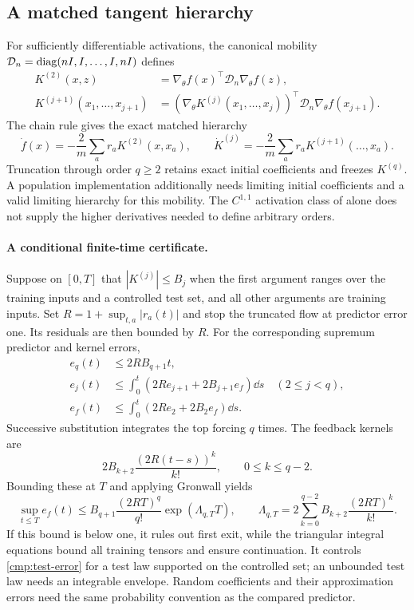 \subsection{A matched tangent hierarchy}
\label{app:comparison-nth}

For sufficiently differentiable activations, the canonical mobility
$\mathcal D_n=\operatorname{diag}(nI,I,\ldots,I,nI)$ defines
\begin{align*}
 K^{(2)}(x,z)&=\nabla_\theta f(x)^\top\mathcal D_n\nabla_\theta f(z),\\
 K^{(j+1)}(x_1,\ldots,x_{j+1})&=
 (\nabla_\theta K^{(j)}(x_1,\ldots,x_j))^\top
 \mathcal D_n\nabla_\theta f(x_{j+1}).
\end{align*}
The chain rule gives the exact matched hierarchy
\begin{equation}
 \dot f(x)=-\frac{2}{m}\sum_a r_aK^{(2)}(x,x_a),\qquad
 \dot K^{(j)}=-\frac{2}{m}\sum_a r_aK^{(j+1)}(\ldots,x_a).
 \label{cmp:nth-flow}
\end{equation}
Truncation through order $q\ge2$ retains exact initial coefficients and
freezes $K^{(q)}$.  A population implementation additionally needs limiting
initial coefficients and a valid limiting hierarchy for this mobility.
The $C^{1,1}$ activation class of  alone does not supply
the higher derivatives needed to define arbitrary orders.

\paragraph{A conditional finite-time certificate.}
Suppose on $[0,T]$ that $|K^{(j)}|\le B_j$ when the first argument ranges
over the training inputs and a controlled test set, and all other arguments
are training inputs.  Set $R=1+\sup_{t,a}|r_a(t)|$ and stop the truncated
flow at predictor error one.  Its residuals are then bounded by $R$.
For the corresponding supremum predictor and kernel errors,
\begin{align}
 e_q(t)&\le2RB_{q+1}t,\nonumber\\
 e_j(t)&\le\int_0^t(2Re_{j+1}+2B_{j+1}e_f)\dd s
                  \quad(2\le j<q),\nonumber\\
 e_f(t)&\le\int_0^t(2Re_2+2B_2e_f)\dd s.
 \label{cmp:nth-recursion}
\end{align}
Successive substitution integrates the top forcing $q$ times.  The feedback
kernels are
\[
 2B_{k+2}\frac{(2R(t-s))^k}{k!},\qquad 0\le k\le q-2.
\]
Bounding these at $T$ and applying Gronwall yields
\begin{equation}
 \sup_{t\le T}e_f(t)\le
 B_{q+1}\frac{(2RT)^q}{q!}\exp(\Lambda_{q,T}T),\qquad
 \Lambda_{q,T}=2\sum_{k=0}^{q-2}B_{k+2}\frac{(2RT)^k}{k!}.
 \label{cmp:nth-bound}
\end{equation}
If this bound is below one, it rules out first exit, while the triangular
integral equations bound all training tensors and ensure continuation.
It controls \eqref{cmp:test-error} for a test law supported on the controlled
set; an unbounded test law needs an integrable envelope.  Random coefficients
and their approximation errors need the same probability convention as the
compared predictor.

